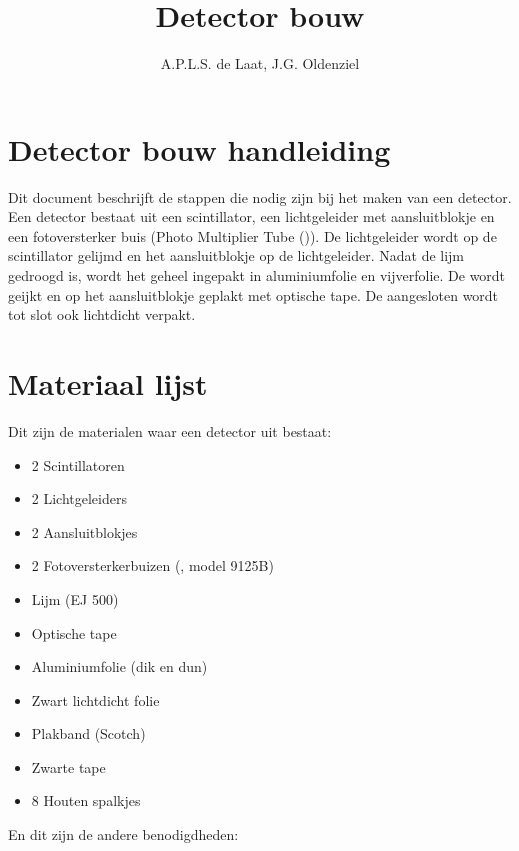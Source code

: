 

\title{Detector bouw}
\author{A.P.L.S. de Laat, J.G. Oldenziel}



\maketitle

\section{Detector bouw handleiding}

Dit document beschrijft de stappen die nodig zijn bij het
maken van een \hisparc detector. Een detector bestaat uit een
scintillator, een lichtgeleider met aansluitblokje en een fotoversterker
buis (Photo Multiplier Tube (\pmt)). De lichtgeleider wordt op de
scintillator gelijmd en het aansluitblokje op de lichtgeleider. Nadat de
lijm gedroogd is, wordt het geheel ingepakt in aluminiumfolie en
vijverfolie. De \pmt wordt geijkt en op het aansluitblokje geplakt met
optische tape. De aangesloten \pmt wordt tot slot ook lichtdicht verpakt.


\section{Materiaal lijst}

Dit zijn de materialen waar een detector uit bestaat:

\begin{itemize}
    \item 2 Scintillatoren
    \item 2 Lichtgeleiders
    \item 2 Aansluitblokjes
    \item 2 Fotoversterkerbuizen (\pmt, model 9125B)
    \item Lijm (EJ 500)
    \item Optische tape
    \item Aluminiumfolie (dik en dun)
    \item Zwart lichtdicht folie
    \item Plakband (Scotch)
    \item Zwarte tape
    \item 8 Houten spalkjes
\end{itemize}

En dit zijn de andere benodigdheden:

